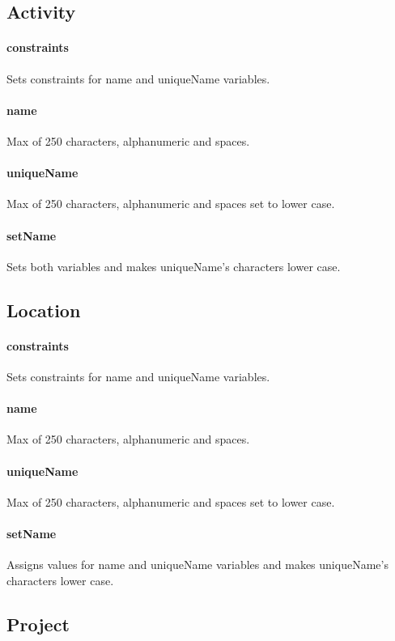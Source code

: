 \documentclass[12pt]{article}
\begin{document}
\subsection{Activity}\label{sec:DActivity}
\paragraph{constraints} Sets constraints for name and uniqueName variables.
\paragraph{name} Max of 250 characters, alphanumeric and spaces.
\paragraph{uniqueName} Max of 250 characters, alphanumeric and spaces set to lower case.
\paragraph{setName} Sets both variables and makes uniqueName's characters lower case.

\setcounter{paragraph}{0}
\subsection{Location}\label{sec:DLocation}
\paragraph{constraints} Sets constraints for name and uniqueName variables.
\paragraph{name} Max of 250 characters, alphanumeric and spaces.
\paragraph{uniqueName} Max of 250 characters, alphanumeric and spaces  set to lower case.
\paragraph{setName} Assigns values for name and uniqueName variables and makes uniqueName's characters lower case.

\setcounter{paragraph}{0}
\subsection{Project}\label{sec:DProject}
\end{document}
